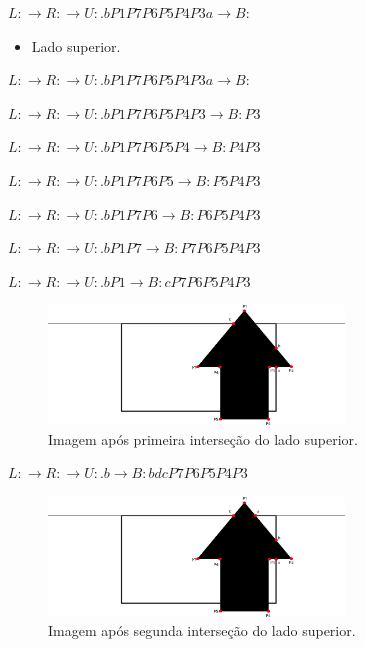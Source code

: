 \documentclass[12pt]{article}
\begin{document}
$L: \xrightarrow{} R: \xrightarrow{} U: .bP1P7P6P5P4P3a \xrightarrow{} B:$

\begin{itemize}
    \item Lado superior.
\end{itemize}

$L: \xrightarrow{} R: \xrightarrow{} U: .bP1P7P6P5P4P3a \xrightarrow{} B:$

$L: \xrightarrow{} R: \xrightarrow{} U: .bP1P7P6P5P4P3 \xrightarrow{} B: P3$

$L: \xrightarrow{} R: \xrightarrow{} U: .bP1P7P6P5P4 \xrightarrow{} B: P4P3$

$L: \xrightarrow{} R: \xrightarrow{} U: .bP1P7P6P5 \xrightarrow{} B: P5P4P3$

$L: \xrightarrow{} R: \xrightarrow{} U: .bP1P7P6 \xrightarrow{} B: P6P5P4P3$

$L: \xrightarrow{} R: \xrightarrow{} U: .bP1P7 \xrightarrow{} B: P7P6P5P4P3$

$L: \xrightarrow{} R: \xrightarrow{} U: .bP1 \xrightarrow{} B: cP7P6P5P4P3$

\begin{figure}[H]
    \centering
    \includegraphics[width=0.7\textwidth]{images/5/5it4.png}
    \caption*{Imagem após primeira interseção do lado superior.}
\end{figure}{}

$L: \xrightarrow{} R: \xrightarrow{} U: .b \xrightarrow{} B: bdcP7P6P5P4P3$

\begin{figure}[H]
    \centering
    \includegraphics[width=0.7\textwidth]{images/5/5it5.png}
    \caption*{Imagem após segunda interseção do lado superior.}
\end{figure}{}
\end{document}
